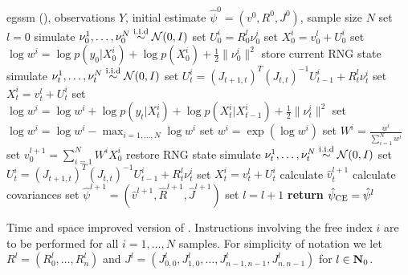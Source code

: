 \begin{algorithm}
    \begin{algorithmic}[1]
        \Require \gls{egssm} (), observations $Y$, initial estimate $\hat\psi^0 = \left( v^{0}, R^{0}, J^{0}\right)$, sample size $N$
        \State set $l = 0$
        \Repeat 
            \State simulate $\nu^{1}_0, \dots, \nu^{N}_0 \stackrel{\text{i.i.d}}{\sim} \mathcal N(0, I)$ 
            \State set $U^{i}_0 = R^{l}_{0}\nu_{0}^{i}$ 
            \State set $X_{0}^{i} = v^{l}_{0} + U^{i}_0$ 
            \State set $\log w^{i} = \log p(y_{0}|X_{0}^{i}) + \log p(X_{0}^i) + \frac{1}{2} \lVert \nu^{i}_0\rVert^{2}$ 
            \State store current RNG state
                \State simulate $\nu^{1}_t, \dots, \nu^{N}_t \stackrel{\text{i.i.d}}{\sim} \mathcal N(0, I)$ 
                \State set $U^{i}_t = (J_{t + 1, t})^{T}(J_{t,t})^{-1}U^{i}_{t - 1} + R^{l}_{t}\nu_{t}^{i}$ 
                \State set $X_{t}^{i} = v^{l}_{t} + U^{i}_t$ 
                \State set $\log w^{i} = \log w^{i} + \log p(y_{t}|X_{t}^{i}) + \log p(X_{t}^i|X_{t - 1}^i) + \frac{1}{2} \lVert \nu^{i}_t\rVert^{2}$ 
            \EndFor
            \State set $\log w^{i} = \log w^{i} - \max_{i = 1,\dots, N} \log w^{i}$ 
            \State set $w^{i} = \exp (\log w^{i})$
            \State set $W^{i} = \frac{w^{i}}{\sum_{i = 1}^N w^{i}}$ 
            \State set $v^{l + 1}_0 = \sum_{i = 1}^{N}W^{i}X_{0}^i$
            \State restore RNG state
                \State simulate $\nu^{1}_t, \dots, \nu^{N}_t \stackrel{\text{i.i.d}}{\sim} \mathcal N(0, I)$ 
                \State set $U^{i}_t = (J_{t + 1, t})^{T}(J_{t,t})^{-1}U^{i}_{t - 1} + R^{l}_{t}\nu_{t}^{i}$ 
                \State set $X_{t}^{i} = v^{l}_{t} + U^{i}_t$ 
                \State calculate $\hat v^{l + 1}_{t}$ 
                \State calculate covariances 
            \EndFor
            \State set $\hat\psi^{l + 1} = \left( \hat v^{l + 1}, \hat R^{l + 1}, \hat J^{l + 1}\right)$ 
            \State set $l = l + 1$
        \State \textbf{return} ${\hat\psi_{\text{CE}}} = \hat \psi^{l}$
        
    \end{algorithmic}
    \caption{Time and space improved version of . Instructions involving the free index $i$ are to be performed for all $i = 1, \dots, N$ samples. For simplicity of notation we let $R^{l} = (R^{l}_0, \dots, R^{l}_n)$ and $J^l = (J^{l}_{0,0}, J^{l}_{1, 0}, \dots, J^{l}_{n - 1, n -1}, J^{l}_{n, n - 1} )$ for $l \in \mathbf N_{0}$.}
    \label{alg:cem-markov-proposal-fast}
\end{algorithm}

